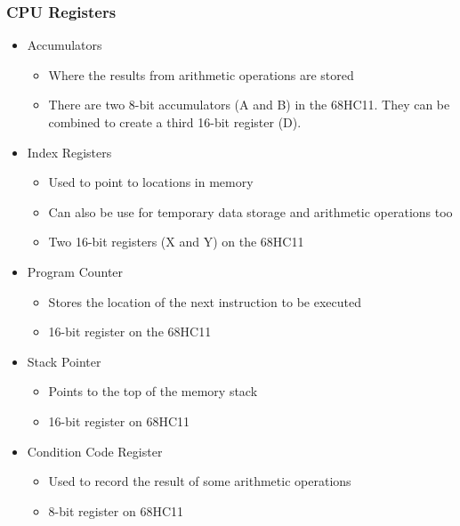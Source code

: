 		\subsubsection{CPU Registers}
			\begin{itemize}
			\item{Accumulators}
				\begin{itemize}
					\item Where the results from arithmetic operations are stored
					\item There are two 8-bit accumulators (A and B) in the 68HC11.
They can be combined to create a third 16-bit register (D).
				\end{itemize}

			\item{Index Registers}
				\begin{itemize}
					\item Used to point to locations in memory
					\item Can also be use for temporary data storage and arithmetic operations too
					\item Two 16-bit registers (X and Y) on the 68HC11
				\end{itemize}
			
			\item{Program Counter}
				\begin{itemize}
					\item Stores the location of the next instruction to be executed
					\item 16-bit register on the 68HC11
				\end{itemize}
			
			\item{Stack Pointer}
				\begin{itemize}
					\item Points to the top of the memory stack
					\item 16-bit register on 68HC11
				\end{itemize}

			\item{Condition Code Register}
				\begin{itemize}
					\item Used to record the result of some arithmetic operations
					\item 8-bit register on 68HC11
				\end{itemize}
			\end{itemize}


